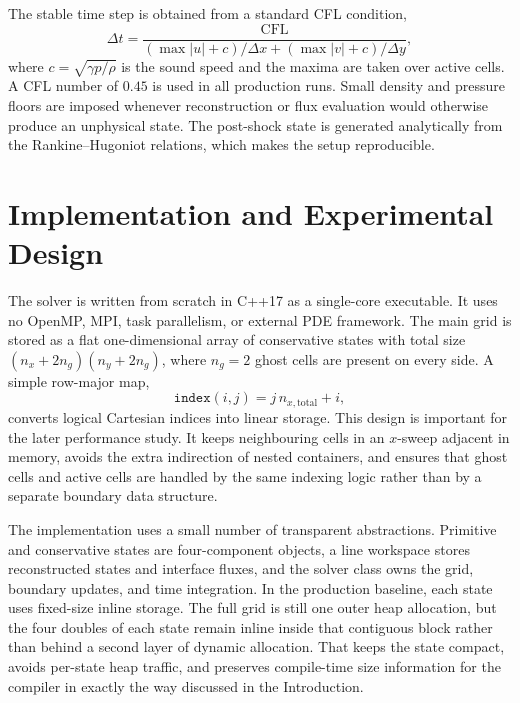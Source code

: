 \documentclass[final,3p,times,twocolumn]{elsarticle}
\begin{document}
The stable time step is obtained from a standard CFL condition,
\begin{equation}
\Delta t = \frac{\mathrm{CFL}}
{\left(\max |u| + c\right)/\Delta x +
\left(\max |v| + c\right)/\Delta y},
\end{equation}
where $c = \sqrt{\gamma p/\rho}$ is the sound speed and the maxima are taken over active cells. A CFL number of $0.45$ is used in all production runs. Small density and pressure floors are imposed whenever reconstruction or flux evaluation would otherwise produce an unphysical state. The post-shock state is generated analytically from the Rankine--Hugoniot relations, which makes the setup reproducible.

\section{Implementation and Experimental Design}

The solver is written from scratch in C++17 as a single-core executable. It uses no OpenMP, MPI, task parallelism, or external PDE framework. The main grid is stored as a flat one-dimensional array of conservative states with total size $(n_x + 2n_g)(n_y + 2n_g)$, where $n_g = 2$ ghost cells are present on every side. A simple row-major map,
\begin{equation}
\texttt{index}(i,j) = j\,n_{x,\mathrm{total}} + i,
\end{equation}
converts logical Cartesian indices into linear storage. This design is important for the later performance study. It keeps neighbouring cells in an $x$-sweep adjacent in memory, avoids the extra indirection of nested containers, and ensures that ghost cells and active cells are handled by the same indexing logic rather than by a separate boundary data structure.

The implementation uses a small number of transparent abstractions. Primitive and conservative states are four-component objects, a line workspace stores reconstructed states and interface fluxes, and the solver class owns the grid, boundary updates, and time integration. In the production baseline, each state uses fixed-size inline storage. The full grid is still one outer heap allocation, but the four doubles of each state remain inline inside that contiguous block rather than behind a second layer of dynamic allocation. That keeps the state compact, avoids per-state heap traffic, and preserves compile-time size information for the compiler in exactly the way discussed in the Introduction.
\end{document}
